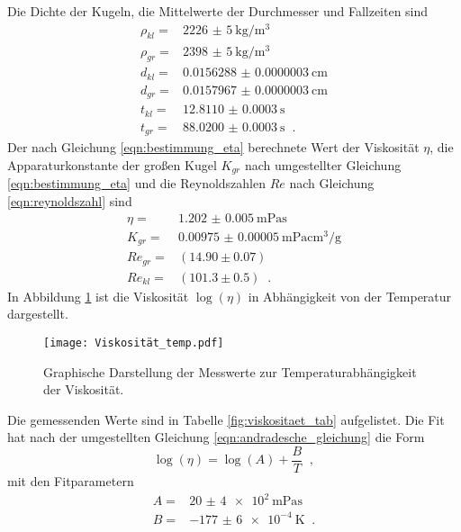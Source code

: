 Die Dichte der Kugeln, die Mittelwerte der Durchmesser und Fallzeiten sind
\begin{align*}
  \rho_{kl}=&\SI[per-mode=fraction]{2226(5)}{\kilo\gram\per\cubic\meter}\\
  \rho_{gr}=&\SI[per-mode=fraction]{2398(5)}{\kilo\gram\per\cubic\meter}\\
  d_{kl}=&\SI[per-mode=fraction]{0.0156288(3)}{\centi\meter}\\
  d_{gr}=&\SI[per-mode=fraction]{0.0157967(3)}{\centi\meter}\\
  t_{kl}=&\SI[per-mode=fraction]{12.8110(3)}{\second}\\
  t_{gr}=&\SI[per-mode=fraction]{88.0200(3)}{\second}\;\;.
\end{align*}
Der nach Gleichung \eqref{eqn:bestimmung_eta} berechnete Wert der Viskosität $\eta$, die Apparaturkonstante der
großen Kugel $K_{gr}$ nach umgestellter Gleichung \eqref{eqn:bestimmung_eta} und die Reynoldszahlen $Re$ nach Gleichung
\eqref{eqn:reynoldszahl} sind
\begin{align*}
  \eta=&\SI{1.202(5)}{\meter\pascal\second}\\
  K_{gr}=&\SI[per-mode=fraction]{0.00975(5)}{\meter\pascal\centi\cubic\meter\per\gram}\\
  Re_{gr}=&(14.90\pm0.07)\\
  Re_{kl}=&(101.3\pm0.5)\;\;.
  \label{eqn:etaKRE}
\end{align*}
In Abbildung \ref{fig:Viskositaet} ist die Viskosität $\log(\eta)$
in Abhängigkeit von der Temperatur dargestellt.
\begin{figure}
  \centering
  \texttt{[image: Viskosität\_temp.pdf]}
  \caption{Graphische Darstellung der Messwerte zur Temperaturabhängigkeit der Viskosität.}
  \label{fig:Viskositaet}
\end{figure}
Die gemessenden Werte sind in Tabelle \ref{fig:viskositaet_tab} aufgelistet. Die Fit hat
nach der umgestellten Gleichung \eqref{eqn:andradesche_gleichung} die Form
\begin{equation}
  \log(\eta)=\log(A)+\frac{B}{T}\;\;,
\end{equation}
mit den Fitparametern
\begin{align*}
  A=&\SI{20(4)e2}{\meter\pascal\second}\\
  B=&\SI[per-mode=fraction]{-177(6)e-4}{\kelvin}\;\;.
\end{align*}
